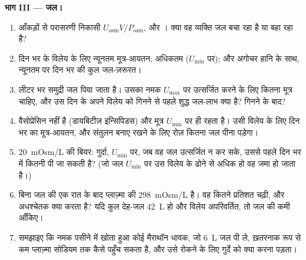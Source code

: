 \begin{problem}
\medskip
\noindent\textbf{भाग III --- जल।}
\begin{enumerate}[resume]
  \item आँकड़ों से परासरणी निकासी $U_{\text{osm}}V/P_{\text{osm}}$, और
        । क्या वह व्यक्ति जल बचा रहा है या बहा रहा है?
  \item दिन भर के विलेय के लिए न्यूनतम मूत्र-आयतन; अधिकतम
        ($U_{\min}$ पर); और अगोचर हानि के साथ, न्यूनतम पर दिन भर की
        कुल जल-ज़रूरत।
  \item लीटर भर समुद्री जल पिया जाता है। उसका नमक $U_{\max}$ पर
        उत्सर्जित करने के लिए कितना मूत्र चाहिए, और उस दिन के अपने
        विलेय को गिनने से पहले शुद्ध जल-लाभ क्या है? गिनने के बाद?
  \item वैसोप्रेसिन नहीं है (डायबिटीज़ इन्सिपिडस) और मूत्र
        $U_{\min}$ पर ही रहता है। उसी विलेय के लिए दिन भर का
        मूत्र-आयतन, और संतुलन बनाए रखने के लिए रोज़ कितना जल पीना
        पड़ेगा।
  \item \qty{20}{mOsm/L} की बियर: गुर्दा, $U_{\min}$ पर, जब वह जल
        उत्सर्जित न कर सके, उससे पहले दिन भर में कितनी पी जा सकती है?
        (जो जल $U_{\min}$ पर उस विलेय के ढोने से अधिक हो वह जमा हो
        जाता है।)
  \item बिना जल की एक रात के बाद प्लाज़्मा की 
        \qty{298}{mOsm/L} है। वह कितने प्रतिशत चढ़ी, और अधश्चेतक क्या
        करता है? यदि कुल देह-जल \qty{42}{L} हो और विलेय अपरिवर्तित, तो
        जल की कमी आँकिए।
  \item समझाइए कि नमक पसीने में खोता हुआ कोई मैराथॉन धावक, जो
        \qty{6}{L} जल पी ले, ख़तरनाक रूप से कम प्लाज़्मा सोडियम तक कैसे
        पहुँच सकता है, और उसे रोकने के लिए गुर्दे को क्या करना पड़ता।
\end{enumerate}


\end{problem}
